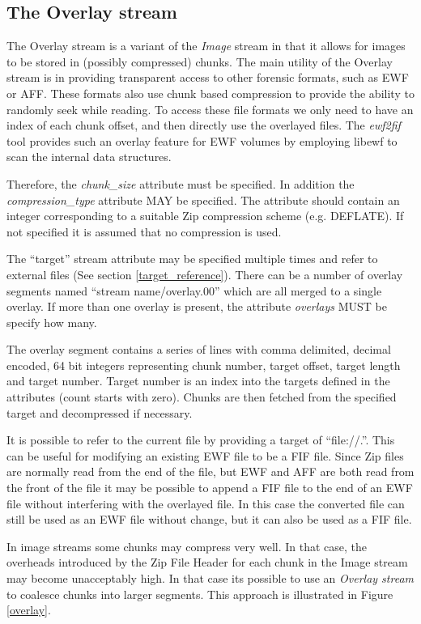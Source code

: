 \documentclass[10pt, conference]{IEEEtran}
\begin{document}
\subsection{The Overlay stream}
The Overlay stream is a variant of the {\em Image} stream in that it
allows for images to be stored in (possibly compressed) chunks. The
main utility of the Overlay stream is in providing transparent access
to other forensic formats, such as EWF or AFF. These formats also use
chunk based compression to provide the ability to randomly seek while
reading. To access these file formats we only need to have an index of
each chunk offset, and then directly use the overlayed files. The {\em
ewf2fif} tool provides such an overlay feature for EWF volumes by
employing libewf to scan the internal data structures.

Therefore, the {\em chunk\_size} attribute must be specified. In
addition the {\em compression\_type} attribute MAY be specified. The
attribute should contain an integer corresponding to a suitable Zip
compression scheme (e.g. DEFLATE). If not specified it is assumed
that no compression is used.

The ``target'' stream attribute may be specified multiple times and
refer to external files (See section \ref{target_reference}). There
can be a number of overlay segments named ``stream name/overlay.00''
which are all merged to a single overlay. If more than one overlay is
present, the attribute {\em overlays} MUST be specify how many.

The overlay segment contains a series of lines with comma delimited,
decimal encoded, 64 bit integers representing chunk number, target
offset, target length and target number. Target number is an index
into the targets defined in the attributes (count starts with zero).
Chunks are then fetched from the specified target and decompressed if
necessary.

It is possible to refer to the current file by providing a target of
``file://.''. This can be useful for modifying an existing EWF file to
be a FIF file. Since Zip files are normally read from the end of the
file, but EWF and AFF are both read from the front of the file it may
be possible to append a FIF file to the end of an EWF file without
interfering with the overlayed file. In this case the converted file
can still be used as an EWF file without change, but it can also be
used as a FIF file.

In image streams some chunks may compress very well. In that case, the
overheads introduced by the Zip File Header for each chunk in the
Image stream may become unacceptably high. In that case its possible
to use an {\em Overlay stream} to coalesce chunks into larger
segments. This approach is illustrated in Figure \ref{overlay}.
\end{document}
